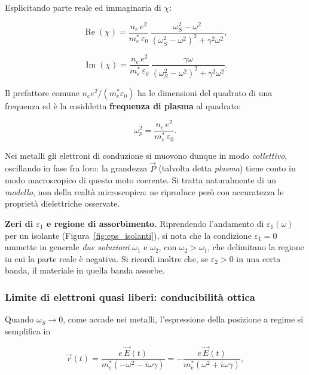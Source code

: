 Esplicitando parte reale ed immaginaria di \( \chi \):

\begin{equation}
    \operatorname{Re}(\chi) = \frac{n_e \, e^{2}}{m_e^{*} \, \varepsilon_0} \, \frac{\omega_S^{2} - \omega^{2}}{(\omega_S^{2} - \omega^{2})^{2} + \gamma^{2} \omega^{2}},
\end{equation}

\begin{equation}
    \operatorname{Im}(\chi) = \frac{n_e \, e^{2}}{m_e^{*} \, \varepsilon_0} \, \frac{\gamma \omega}{(\omega_S^{2} - \omega^{2})^{2} + \gamma^{2} \omega^{2}}.
\end{equation}

Il prefattore comune \( n_e e^{2} / (m_e^{*} \varepsilon_0) \) ha le dimensioni del quadrato di una frequenza ed è la cosiddetta \textbf{frequenza di plasma} al quadrato:

\begin{equation}
    \omega_p^{2} = \frac{n_e \, e^{2}}{m_e^{*} \, \varepsilon_0}.
\end{equation}

Nei metalli gli elettroni di conduzione si muovono dunque in modo \emph{collettivo}, oscillando in fase fra loro: la grandezza \( \vec{P} \) (talvolta detta \emph{plasma}) tiene conto in modo macroscopico di questo moto coerente. Si tratta naturalmente di un \emph{modello}, non della realtà microscopica: ne riproduce però con accuratezza le proprietà dielettriche osservate.

\textbf{Zeri di \( \varepsilon_1 \) e regione di assorbimento.} Riprendendo l'andamento di \( \varepsilon_1(\omega) \) per un isolante (Figura~\ref{fig:eps_isolanti}), si nota che la condizione \( \varepsilon_1 = 0 \) ammette in generale \emph{due soluzioni} \( \omega_1 \) e \( \omega_2 \), con \( \omega_2 > \omega_1 \), che delimitano la regione in cui la parte reale è negativa. Si ricordi inoltre che, se \( \varepsilon_2 > 0 \) in una certa banda, il materiale in quella banda assorbe.

\subsubsection{Limite di elettroni quasi liberi: conducibilità ottica}

Quando \( \omega_S \to 0 \), come accade nei metalli, l'espressione della posizione a regime si semplifica in

\begin{equation}
    \vec{r}(t) = \frac{e \, \vec{E}(t)}{m_e^{*} (-\omega^{2} - i \omega \gamma)} = -\frac{e \, \vec{E}(t)}{m_e^{*} (\omega^{2} + i \omega \gamma)},
\end{equation}

